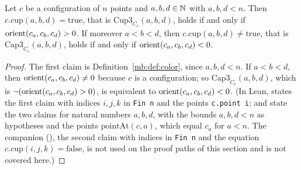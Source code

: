 \begin{lemma}\label{mb:lem:signs}\raggedright
Let $c$ be a configuration of $n$ points and $a,b,d\in\mathbb N$ with $a,b,d<n$. Then $c.\mathrm{cup}(a,b,d)=\mathrm{true}$,
that is $\mathrm{Cup3}_{C_c}(a,b,d)$, holds if and only if $\operatorname{orient}(c_a,c_b,c_d)>0$. If moreover $a<b<d$, then
$c.\mathrm{cup}(a,b,d)\ne\mathrm{true}$, that is $\mathrm{Cap3}_{C_c}(a,b,d)$, holds if and only if
$\operatorname{orient}(c_a,c_b,c_d)<0$.
\end{lemma}

\begin{proof}
The first claim is Definition~\ref{mb:def:color}, since $a,b,d<n$. If $a<b<d$, then $\operatorname{orient}(c_a,c_b,c_d)\ne0$ because
$c$ is a configuration; so $\mathrm{Cap3}_{C_c}(a,b,d)$, which is $\neg(\operatorname{orient}(c_a,c_b,c_d)>0)$, is equivalent to
$\operatorname{orient}(c_a,c_b,c_d)<0$. (In Lean,  states the first claim with indices $i,j,k$ in \texttt{Fin n}
and the points \texttt{c.point i};  and  state the two claims for natural numbers
$a,b,d$, with the bounds $a,b,d<n$ as hypotheses and the points $\mathrm{pointAt}(c,a)$, which equal $c_a$ for $a<n$.
The companion  (), the second claim
with indices in \texttt{Fin n} and the equation $c.\mathrm{cup}(i,j,k)=\mathrm{false}$, is not used on the proof paths
of this section and is not covered here.)
\end{proof}

